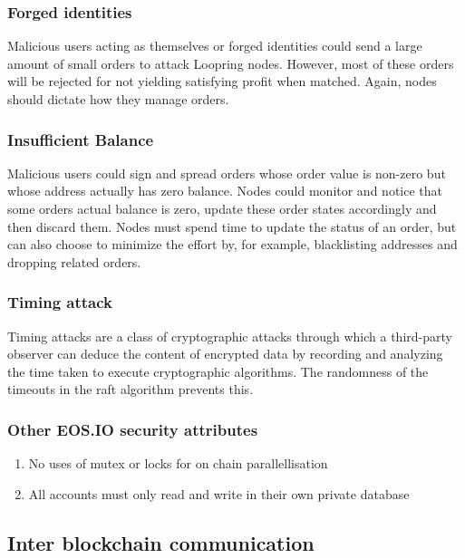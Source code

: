 \documentclass[]{article}
\begin{document}
		
		\subsubsection{Forged identities}
		Malicious users acting as themselves or forged identities 
		could send a large amount of small orders to attack Loopring
		nodes. However, most of these orders will be rejected 
		for not yielding satisfying profit when matched. 
		Again, nodes should dictate how they manage orders.
		
		\subsubsection{Insufficient Balance}
		Malicious users could sign and spread orders whose order 
		value is non-zero but whose address actually has zero 
		balance. Nodes could monitor and notice that some orders 
		actual balance is zero, update these order states accordingly
		and then discard them. Nodes must spend time to update
		the status of an order, but can also choose to minimize the
		effort by, for example, blacklisting addresses and dropping
		related orders.
		
		\subsubsection{Timing attack}
		 Timing attacks are a class of cryptographic attacks through which a third-party observer can deduce the content of encrypted data 
		 by recording and analyzing the time taken to execute cryptographic algorithms.
		 The randomness of the timeouts in the raft algorithm prevents this.
		
		\subsubsection{Other EOS.IO security attributes}
		\begin{enumerate}
		\item No uses of mutex or locks for on chain parallellisation
		\item All accounts must only read and write in their own private database
		\end{enumerate}
		
	\subsection{Inter blockchain communication}
	
\end{document}
